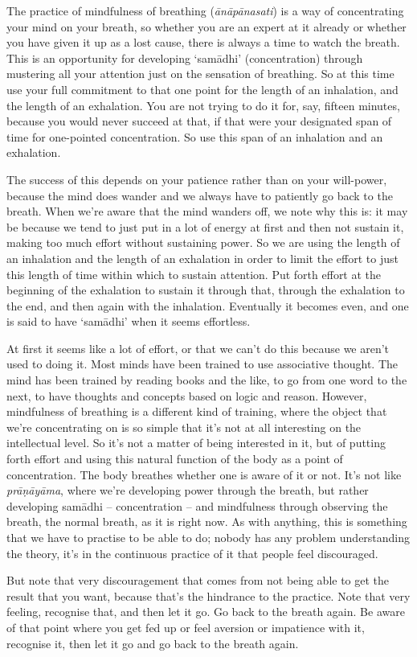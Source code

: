 
The practice of mindfulness of breathing (\textit{ānāpānasati}) is a way of concentrating your mind on your breath, so whether you are an expert at it already or whether you have given it up as a lost cause, there is always a time to watch the breath. This is an opportunity for developing `samādhi' (concentration) through mustering all your attention just on the sensation of breathing. So at this time use your full commitment to that one point for the length of an inhalation, and the length of an exhalation. You are not trying to do it for, say, fifteen minutes, because you would never succeed at that, if that were your designated span of time for one-pointed concentration. So use this span of an inhalation and an exhalation.

The success of this depends on your patience rather than on your will-power, because the mind does wander and we always have to patiently go back to the breath. When we're aware that the mind wanders off, we note why this is: it may be because we tend to just put in a lot of energy at first and then not sustain it, making too much effort without sustaining power. So we are using the length of an inhalation and the length of an exhalation in order to limit the effort to just this length of time within which to sustain attention. Put forth effort at the beginning of the exhalation to sustain it through that, through the exhalation to the end, and then again with the inhalation. Eventually it becomes even, and one is said to have `samādhi' when it seems effortless.

At first it seems like a lot of effort, or that we can't do this because we aren't used to doing it. Most minds have been trained to use associative thought. The mind has been trained by reading books and the like, to go from one word to the next, to have thoughts and concepts based on logic and reason. However, mindfulness of breathing is a different kind of training, where the object that we're concentrating on is so simple that it's not at all interesting on the intellectual level. So it's not a matter of being interested in it, but of putting forth effort and using this natural function of the body as a point of concentration. The body breathes whether one is aware of it or not. It's not like \textit{prāṇāyāma}, where we're developing power through the breath, but rather developing samādhi -- concentration -- and mindfulness through observing the breath, the normal breath, as it is right now. As with anything, this is something that we have to practise to be able to do; nobody has any problem understanding the theory, it's in the continuous practice of it that people feel discouraged.

But note that very discouragement that comes from not being able to get the result that you want, because that's the hindrance to the practice. Note that very feeling, recognise that, and then let it go. Go back to the breath again. Be aware of that point where you get fed up or feel aversion or impatience with it, recognise it, then let it go and go back to the breath again.
